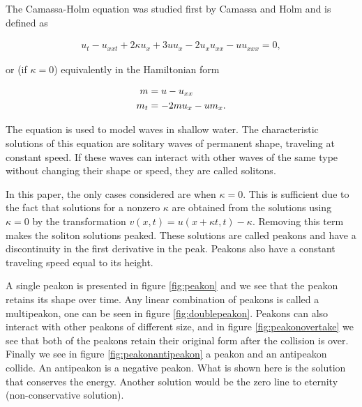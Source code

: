 The Camassa-Holm equation was studied first by Camassa and Holm \cite{camassa1993integrable} and is defined as

\begin{align*}
u_{t} - u_{xxt} + 2\kappa u_{x} + 3uu_{x} - 2u_{x}u_{xx} - uu_{xxx} = 0,
\end{align*}

or (if $\kappa = 0$) equivalently in the Hamiltonian form

\begin{align}
m &= u - u_{xx} \notag \\
m_t &= -2mu_x - um_x.
\label{eq:CHhamiltonian}
\end{align}

The equation is used to model waves in shallow water. The characteristic solutions of this equation are solitary waves of permanent shape, traveling at constant speed. If these waves can interact with other waves of the same type without changing their shape or speed, they are called solitons. 



In this paper, the only cases considered are when $\kappa = 0$. This is sufficient due to the fact that solutions for a nonzero $\kappa$ are obtained from the solutions using $\kappa = 0$ by the transformation $v(x,t) = u(x + \kappa t, t) - \kappa$. Removing this term makes the soliton solutions peaked. These solutions are called peakons and have a discontinuity in the first derivative in the peak. Peakons also have a constant traveling speed equal to its height.

A single peakon is presented in figure \ref{fig:peakon} and we see that the peakon retains its shape over time. Any linear combination of peakons is called a multipeakon, one can be seen in figure \ref{fig:doublepeakon}. Peakons can also interact with other peakons of different size, and in figure \ref{fig:peakonovertake} we see that both of the peakons retain their original form after the collision is over. Finally we see in figure \ref{fig:peakonantipeakon} a peakon and an antipeakon collide. An antipeakon is a negative peakon. What is shown here is the solution that conserves the energy. Another solution would be the zero line to eternity (non-conservative solution).


